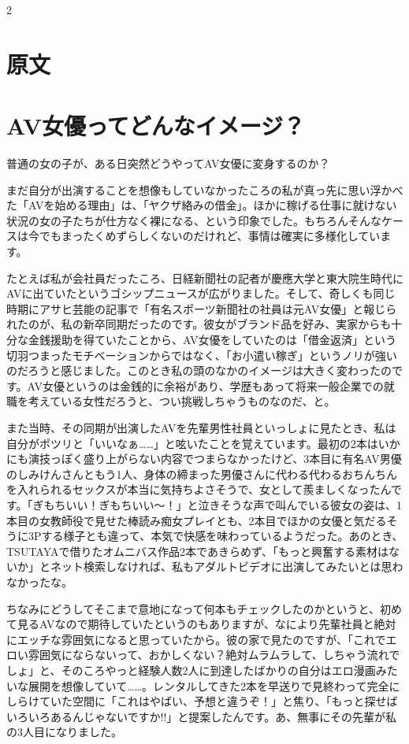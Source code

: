 \documentclass[12pt,UTF8]{ctexbook}
\begin{document}
\begin{paracol}{2}

\section*{原文}

\section{AV女優ってどんなイメージ？}

普通の女の子が、ある日突然どうやってAV女優に変身するのか？

まだ自分が出演することを想像もしていなかったころの私が真っ先に思い浮かべた「AVを始める理由」は、「ヤクザ絡みの借金」。ほかに稼げる仕事に就けない状況の女の子たちが仕方なく裸になる、という印象でした。もちろんそんなケースは今でもまったくめずらしくないのだけれど、事情は確実に多様化しています。

たとえば私が会社員だったころ、日経新聞社の記者が慶應大学と東大院生時代にAVに出ていたというゴシップニュースが広がりました。そして、奇しくも同じ時期にアサヒ芸能の記事で「有名スポーツ新聞社の社員は元AV女優」と報じられたのが、私の新卒同期だったのです。彼女がブランド品を好み、実家からも十分な金銭援助を得ていたことから、AV女優をしていたのは「借金返済」という切羽つまったモチベーションからではなく、「お小遣い稼ぎ」というノリが強いのだろうと感じました。このとき私の頭のなかのイメージは大きく変わったのです。AV女優というのは金銭的に余裕があり、学歴もあって将来一般企業での就職を考えている女性だろうと、つい挑戦しちゃうものなのだ、と。

また当時、その同期が出演したAVを先輩男性社員といっしょに見たとき、私は自分がポツリと「いいなぁ……」と呟いたことを覚えています。最初の2本はいかにも演技っぽく盛り上がらない内容でつまらなかったけど、3本目に有名AV男優のしみけんさんともう1人、身体の締まった男優さんに代わる代わるおちんちんを入れられるセックスが本当に気持ちよさそうで、女として羨ましくなったんです。「ぎもちいい！ぎもちいい〜！」と泣きそうな声で叫んでいる彼女の姿は、1本目の女教師役で見せた棒読み痴女プレイとも、2本目でほかの女優と気だるそうに3Pする様子とも違って、本気で快感を味わっているようだった。あのとき、TSUTAYAで借りたオムニバス作品2本であきらめず、「もっと興奮する素材はないか」とネット検索しなければ、私もアダルトビデオに出演してみたいとは思わなかったな。

ちなみにどうしてそこまで意地になって何本もチェックしたのかというと、初めて見るAVなので期待していたというのもありますが、なにより先輩社員と絶対にエッチな雰囲気になると思っていたから。彼の家で見たのですが、「これでエロい雰囲気にならないって、おかしくない？絶対ムラムラして、しちゃう流れでしょ」と、そのころやっと経験人数2人に到達したばかりの自分はエロ漫画みたいな展開を想像していて……。レンタルしてきた2本を早送りで見終わって完全にしらけていた空間に「これはやばい、予想と違うぞ！」と焦り、「もっと探せばいろいろあるんじゃないですか!!」と提案したんです。あ、無事にその先輩が私の3人目になりました。


\end{paracol}
\end{document}
